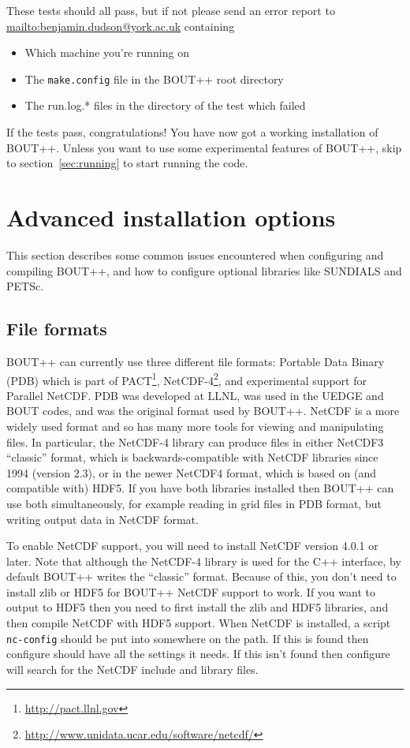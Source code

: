 \documentclass[12pt]{article}
\begin{document}
These tests should all pass, but if not please send an error report to
\url{mailto:benjamin.dudson@york.ac.uk} containing
%
\begin{itemize}
\item Which machine you're running on
\item The \texttt{make.config} file in the BOUT++ root directory
\item The run.log.* files in the directory of the test which failed
\end{itemize}
%
If the tests pass, congratulations! You have now got a working installation of
BOUT++.  Unless you want to use some experimental features of BOUT++, skip to
section~\ref{sec:running} to start running the code.





\section{Advanced installation options}
%
\label{sec:advancedinstall}
%
This section describes some common issues encountered when configuring and
compiling BOUT++, and how to configure optional libraries like SUNDIALS and
PETSc.



\subsection{File formats}
%
BOUT++ can currently use three different file formats: Portable Data Binary
(PDB) which is part of PACT\footnote{\url{http://pact.llnl.gov}},
NetCDF-4\footnote{\url{http://www.unidata.ucar.edu/software/netcdf/}}, and
experimental support for Parallel NetCDF.  PDB was developed at LLNL, was used
in the UEDGE and BOUT codes, and was the original format used by BOUT++. NetCDF
is a more widely used format and so has many more tools for viewing and
manipulating files.  In particular, the NetCDF-4 library can produce files in
either NetCDF3 ``classic'' format, which is backwards-compatible with NetCDF
libraries since 1994 (version 2.3), or in the newer NetCDF4 format, which is
based on (and compatible with) HDF5. If you have both libraries installed then
BOUT++ can use both simultaneously, for example reading in grid files in PDB
format, but writing output data in NetCDF format.

To enable NetCDF support, you will need to install NetCDF version 4.0.1 or
later.  Note that although the NetCDF-4 library is used for the C++ interface,
by default BOUT++ writes the ``classic'' format. Because of this, you don't
need to install zlib or HDF5 for BOUT++ NetCDF support to work.  If you want to
output to HDF5 then you need to first install the zlib and HDF5 libraries, and
then compile NetCDF with HDF5 support.  When NetCDF is installed, a script
\texttt{nc-config} should be put into somewhere on the path. If this is found
then configure should have all the settings it needs. If this isn't found then
configure will search for the NetCDF include and library files.
\end{document}
